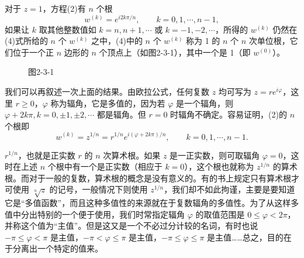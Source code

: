 对于 $z=1$，方程(2)有 $n$ 个根
\begin{equation}
 w^{(k)}=e^{i2k\pi/n},\qquad k=0,1,\cdots,n-1,
 \tag{4}
\end{equation}
如果让 $k$ 取其他整数值如 $k=n,n+1,\cdots$ 或 $k=-1,-2,\cdots$，所得的 $w^{(k)}$ 仍然在(4)式所给的 $n$ 个 $w^{(k)}$ 之中，(4)中的 $n$ 个 $w^{(k)}$ 称为 1 的 $n$ 个 $n$ 次单位根，它们位于一个正 $n$ 边形的 $n$ 个顶点上（如图2-3-1），其中一个是 1（即 $w^{(0)}$）。

\begin{figure}[htbp]
\centering
{}
\caption*{图2-3-1}
\end{figure}

我们可以再叙述一次上面的结果。由欧拉公式，任何复数 $z$ 均可写为 $z=re^{i\varphi}$，这里 $r\ge0$，$\varphi$ 称为辐角，它是多值的，因为若 $\varphi$ 是一个辐角，则 $\varphi+2k\pi,k=0,\pm1,\pm2,\cdots$ 都是辐角。但 $r=0$ 时辐角不确定。容易证明，(2)的 $n$ 个根即
\begin{equation}
 w^{(k)}=z^{1/n}=r^{1/n}e^{i(\varphi+2k\pi)/n},\qquad k=0,1,\cdots,n-1.
 \tag{5}
\end{equation}

$r^{1/n}$，也就是正实数 $r$ 的 $n$ 次算术根。如果 $z$ 是一正实数，则可取辐角 $\varphi=0$，这时在上述 $n$ 个根中有一个是正实数（相应于 $k=0$），这个根也就称为 $z^{1/n}$ 的算术根。而对于一般的复数，算术根的概念是没有意义的。有的书上规定只有算术根才可使用 $\sqrt[n]{z}$ 的记号，一般情况下则使用 $z^{1/n}$，我们却不如此拘谨，主要是要知道它是“多值函数”，而且这种多值性的来源就在于复数辐角的多值性。为了从这样多值中分出特别的一个便于使用，我们时常指定辐角 $\varphi$ 的取值范围是 $0\le\varphi<2\pi$，并称这个值为“主值”。但是这又是一个不必过分计较的名词，有时也说 $-\pi\le\varphi<\pi$ 是主值，$-\pi<\varphi\le\pi$ 是主值，$-\pi\le\varphi\le\pi$ 是主值……总之，目的在于分离出一个特定的值来。

